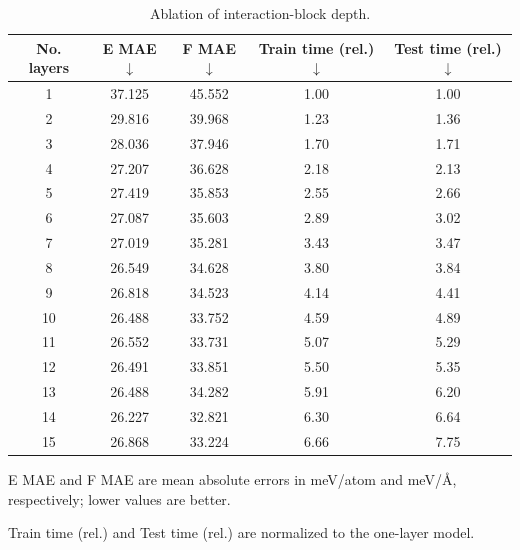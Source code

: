 \begin{table}[ht]
    \PaperTableStyle
    \begin{threeparttable}
        \caption{Ablation of interaction-block depth.}
        \label{tab:sm_layers}
        \begin{tabular*}{\linewidth}{@{\extracolsep{\fill}}ccccc@{}}
        \toprule
        \textbf{No. layers}               &
        \textbf{E MAE}$\downarrow$\tnote{a} &
        \textbf{F MAE}$\downarrow$\tnote{a} &
        \textbf{Train time (rel.)}$\downarrow$\tnote{b} &
        \textbf{Test time (rel.)}$\downarrow$\tnote{b}                  \\
        \midrule
        1                                 & 37.125 & 45.552 & 1.00 & 1.00 \\
        2                                 & 29.816 & 39.968 & 1.23 & 1.36 \\
        3                                 & 28.036 & 37.946 & 1.70 & 1.71 \\
        4                                 & 27.207 & 36.628 & 2.18 & 2.13 \\
        5                                 & 27.419 & 35.853 & 2.55 & 2.66 \\
        6                                 & 27.087 & 35.603 & 2.89 & 3.02 \\
        7                                 & 27.019 & 35.281 & 3.43 & 3.47 \\
        8                                 & 26.549 & 34.628 & 3.80 & 3.84 \\
        9                                 & 26.818 & 34.523 & 4.14 & 4.41 \\
        10                                & 26.488 & 33.752 & 4.59 & 4.89 \\
        11                                & 26.552 & 33.731 & 5.07 & 5.29 \\
        12                                & 26.491 & 33.851 & 5.50 & 5.35 \\
        13                                & 26.488 & 34.282 & 5.91 & 6.20 \\
        14                                & 26.227 & 32.821 & 6.30 & 6.64 \\
        15                                & 26.868 & 33.224 & 6.66 & 7.75 \\
        \bottomrule
        \end{tabular*}
        \begin{tablenotes}[flushleft]
            \PaperTableNotesStyle
            \item[a] E MAE and F MAE are mean absolute errors in meV/atom and meV/\AA, respectively; lower values are better.
            \item[b] Train time (rel.) and Test time (rel.) are normalized to the one-layer model.
        \end{tablenotes}
    \end{threeparttable}
\end{table}

